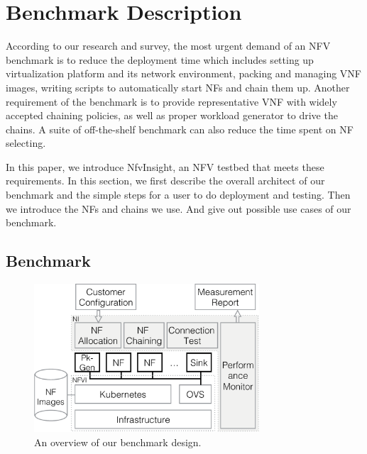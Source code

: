 \section{Benchmark Description}

According to our research and survey,
the most urgent demand of an NFV benchmark is
to reduce the deployment time which includes
setting up virtualization platform and its network environment,
packing and managing VNF images,
writing scripts to automatically start NFs and chain them up.
Another requirement of the benchmark is to provide
representative VNF with widely accepted chaining policies,
as well as proper workload generator to drive the chains.
A suite of off-the-shelf benchmark can also
reduce the time spent on NF selecting.

In this paper, we introduce NfvInsight, an NFV testbed that meets these
requirements. 
In this section, we first describe the overall architect of our benchmark
and the simple steps for a user to do deployment and testing.
Then we introduce the NFs and chains we use.
And give out possible use cases of our benchmark.

%

%
%
%

\subsection{Benchmark}

\begin{figure}[!t]
\centering
\includegraphics[width=3.3in]{fig/design2.pdf}
\caption{An overview of our benchmark design.}
\label{design}
\end{figure}

